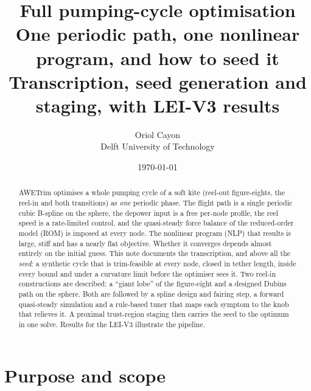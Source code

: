 \documentclass[11pt,a4paper]{article}
\title{%
  \vspace{-1.5cm}
  {\Huge\textbf{Full pumping-cycle optimisation}}\\[6pt]
  {\large One periodic path, one nonlinear program, and how to seed it}\\[10pt]
  {\normalsize Transcription, seed generation and staging, with LEI-V3 results}
}
\author{Oriol Cayon \\ \small Delft University of Technology}
\date{\today}
\begin{document}
\maketitle
\thispagestyle{fancy}

\begin{abstract}
\noindent
AWETrim optimises a whole pumping cycle of a soft kite (reel-out figure-eights,
the reel-in and both transitions) as \emph{one} periodic phase. The flight
path is a single periodic cubic B-spline on the sphere, the depower input is a
free per-node profile, the reel speed is a rate-limited control, and the
quasi-steady force balance of the reduced-order model (ROM) is imposed at every
node. The nonlinear program (NLP) that results is large, stiff and has a
nearly flat objective. Whether it converges depends almost entirely on the
initial guess. This note documents the transcription, and above all the
\emph{seed}: a synthetic cycle that is
trim-feasible at every node, closed in tether length, inside every bound
and under a curvature limit before the optimiser sees it. Two reel-in
constructions are described: a ``giant lobe'' of the figure-eight and a
designed Dubins path on the sphere. Both are followed by a spline design and
fairing step, a forward quasi-steady simulation and a rule-based tuner that
maps each symptom to the knob that relieves it. A proximal trust-region staging
then carries the seed to the optimum in one solve. Results for the LEI-V3
illustrate the pipeline.
\end{abstract}

\tableofcontents

\section{Purpose and scope}
\end{document}
